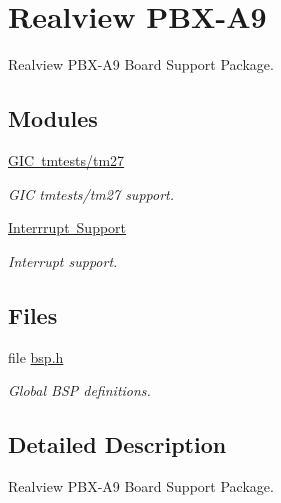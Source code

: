 \hypertarget{group__RTEMSBSPsARMRealviewPBXA9}{}\section{Realview P\+B\+X-\/\+A9}
\label{group__RTEMSBSPsARMRealviewPBXA9}


Realview P\+B\+X-\/\+A9 Board Support Package.  


\subsection*{Modules}
\begin{DoxyCompactItemize}
\item 
\mbox{\hyperlink{group__realview-pbx-a9__tm27}{G\+I\+C tmtests/tm27}}
\begin{DoxyCompactList}\small\item\em G\+IC tmtests/tm27 support. \end{DoxyCompactList}\item 
\mbox{\hyperlink{group__realview-pbx-a9__interrupt}{Interrrupt Support}}
\begin{DoxyCompactList}\small\item\em Interrupt support. \end{DoxyCompactList}\end{DoxyCompactItemize}
\subsection*{Files}
\begin{DoxyCompactItemize}
\item 
file \mbox{\hyperlink{bsps_2arm_2realview-pbx-a9_2include_2bsp_8h}{bsp.\+h}}
\begin{DoxyCompactList}\small\item\em Global B\+SP definitions. \end{DoxyCompactList}\end{DoxyCompactItemize}


\subsection{Detailed Description}
Realview P\+B\+X-\/\+A9 Board Support Package. 

